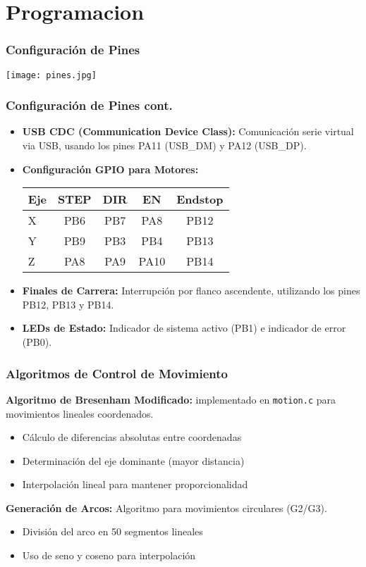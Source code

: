 \documentclass{beamer}
\begin{document}
\section{Programacion}
\begin{frame}
    \frametitle{Configuración de Pines}
    \centering
    \texttt{[image: pines.jpg]}
\end{frame}

\begin{frame}
    \frametitle{Configuración de Pines cont.}
\begin{itemize}
    \item \textbf{USB CDC (Communication Device Class):} Comunicación serie virtual via USB, usando los pines PA11 (USB\_DM) y PA12 (USB\_DP).
    \item \textbf{Configuración GPIO para Motores:} 
    \begin{table}[h]
    \centering
    \begin{tabular}{|l|c|c|c|c|}
    \hline
    \textbf{Eje} & \textbf{STEP} & \textbf{DIR} & \textbf{EN} & \textbf{Endstop} \\
    \hline
    X & PB6 & PB7 & PA8 & PB12 \\
    Y & PB9 & PB3 & PB4 & PB13 \\
    Z & PA8 & PA9 & PA10 & PB14 \\
    \hline
    \end{tabular}
    \end{table}
    \item \textbf{Finales de Carrera:} Interrupción por flanco ascendente, utilizando los pines PB12, PB13 y PB14.
    \item \textbf{LEDs de Estado:} Indicador de sistema activo (PB1) e indicador de error (PB0).
\end{itemize}
\end{frame}

\begin{frame}
    \frametitle{Algoritmos de Control de Movimiento}
\textbf{Algoritmo de Bresenham Modificado:} implementado en \texttt{motion.c} para movimientos lineales coordenados.

\begin{itemize}
    \item Cálculo de diferencias absolutas entre coordenadas
    \item Determinación del eje dominante (mayor distancia)
    \item Interpolación lineal para mantener proporcionalidad
\end{itemize}

\textbf{Generación de Arcos:} Algoritmo para movimientos circulares (G2/G3).

\begin{itemize}
    \item División del arco en 50 segmentos lineales
    \item Uso de seno y coseno para interpolación
\end{itemize}

\end{frame}
\end{document}
